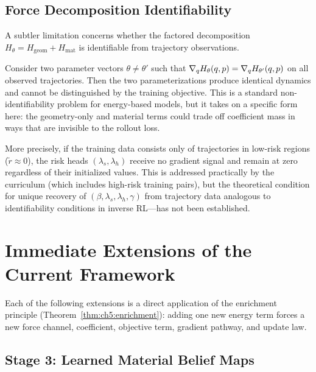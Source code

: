 \subsection{Force Decomposition Identifiability}
\label{subsec:ch7:identifiability}

A subtler limitation concerns whether the factored decomposition
$H_\theta = H_{\mathrm{geom}} + H_{\mathrm{mat}}$ is identifiable
from trajectory observations.

Consider two parameter vectors $\theta \neq \theta'$ such that
$\nabla_q H_\theta(q,p) = \nabla_q H_{\theta'}(q,p)$
on all observed trajectories.
Then the two parameterizations produce identical dynamics and cannot
be distinguished by the training objective.
This is a standard non-identifiability problem for energy-based models,
but it takes on a specific form here:
the geometry-only and material terms could trade off coefficient mass
in ways that are invisible to the rollout loss.

More precisely, if the training data consists only of trajectories
in low-risk regions ($\tilde{r} \approx 0$), the risk heads
$(\lambda_s, \lambda_h)$ receive no gradient signal and remain at
zero regardless of their initialized values.
This is addressed practically by the curriculum (which includes
high-risk training pairs), but the theoretical condition for
unique recovery of $(\beta, \lambda_s, \lambda_h, \gamma)$ from
trajectory data analogous to identifiability conditions in inverse
RL—has not been established.

\section{Immediate Extensions of the Current Framework}
\label{sec:ch7:extensions}

Each of the following extensions is a direct application of the
enrichment principle (Theorem~\ref{thm:ch5:enrichment}): adding one
new energy term forces a new force channel, coefficient, objective
term, gradient pathway, and update law.

\subsection{Stage 3: Learned Material Belief Maps}
\label{subsec:ch7:stage3}


